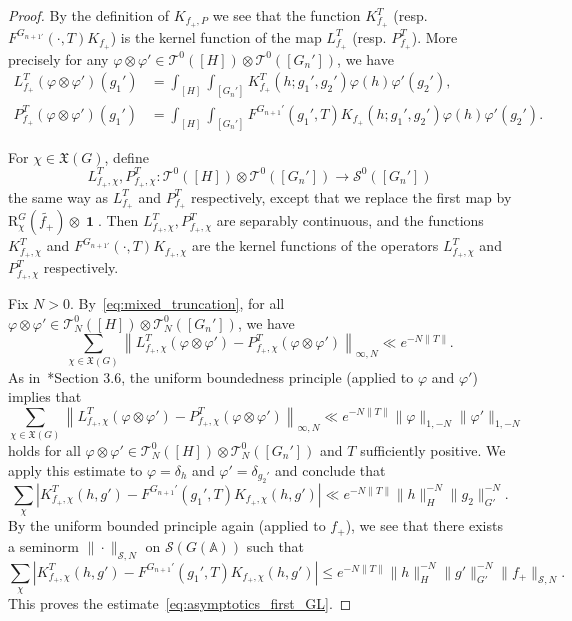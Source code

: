 \documentclass[letterpaper,11pt]{amsart}
\newcommand{\fX}{\mathfrak{X}}
\newcommand{\bA}{\mathbb{A}}
\newcommand{\cS}{\mathcal{S}}
\newcommand{\cT}{\mathcal{T}}
\newcommand{\<}{\negthickspace}
\providecommand{\aabs}[1]{\lVert#1\rVert}
\providecommand{\Abs}[1]{\left\lvert#1\right\rvert}
\DeclareMathOperator{\id}{\mathbf{1}}
\theoremstyle{definition}
\theoremstyle{plain}
\theoremstyle{remark}
\numberwithin{equation}{section}
\begin{document}
\begin{proof}
By the definition of $K_{f_+, P}$ we see that the function $K_{f_+}^T$ (resp.
$F^{G_{n+1'}}(\cdot,T) K_{f_+}$) is the kernel function of the map
$L_{f_+}^T$ (resp. $P_{f_+}^T$). More precisely for any $\varphi \otimes
\varphi' \in \cT^0([H]) \otimes \cT^0([G_n'])$, we have
    \[
    \begin{aligned}
    L_{f_+}^T(\varphi \otimes \varphi')(g_1')
    &= \int_{[H]} \int_{[G_n']} K_{f_+}^T(h; g_1',g_2')
    \varphi(h) \varphi'(g_2'), \\
    P_{f_+}^T(\varphi \otimes \varphi')(g_1')
    &= \int_{[H]} \int_{[G_n']} F^{G_{n+1}'}(g_1',T)
    K_{f_+}(h;g_1',g_2') \varphi(h) \varphi'(g_2').
    \end{aligned}
    \]

For $\chi \in \fX(G)$, define
    \[
    L_{f_+,\chi}^T, P_{f_+, \chi}^T: \cT^0([H]) \otimes
    \cT^0([G_n']) \to \cS^0([G_n'])
    \]
the same way as $L_{f_+}^T$ and $P_{f_+}^T$ respectively, except that we
replace the first map by $\mathrm{R}_{\chi}^G(\widetilde{f_+}) \otimes \id$.
Then $L_{f_+,\chi}^T, P_{f_+, \chi}^T$ are separably continuous, and the functions $K_{f_+,\chi}^T$ and $F^{G_{n+1'}}(\cdot,T)
K_{f_+,\chi}$ are the kernel functions of the operators $L_{f_+,\chi}^T$ and $P_{f_+,\chi}^T$ respectively.


Fix $N >0$. By~\eqref{eq:mixed_truncation}, for all $\varphi \otimes \varphi'
\in \cT_N^0([H]) \otimes \cT_N^0([G_n'])$, we have
    \[
    \sum_{\chi \in \fX(G)} \left\| L_{f_+,\chi}^T (\varphi \otimes \varphi')
    -  P_{f_+,\chi}^T (\varphi \otimes \varphi') \right\|_{\infty,N}
    \ll e^{-N\aabs{T}}.
    \]
As in~\cite{BPCZ}*{Section 3.6}, the uniform boundedness principle (applied to
$\varphi$ and $\varphi'$) implies that
    \[
    \sum_{\chi \in \fX(G)} \left\| L_{f_+,\chi}^T (\varphi \otimes \varphi') -
    P_{f_+,\chi}^T (\varphi \otimes \varphi') \right\|_{\infty,N}
    \ll e^{-N\|T\|} \| \varphi \|_{1,-N} \| \varphi' \|_{1,-N}
    \]
holds for all $\varphi \otimes \varphi' \in \cT^0_N([H]) \otimes
\cT^0_N([G_n'])$ and $T$ sufficiently positive. We apply this estimate to $\varphi
= \delta_h$ and $\varphi' = \delta_{g_2'}$ and conclude that
    \[
    \sum_{\chi} \Abs{ K_{f_+, \chi}^T(h, g') -
    F^{G_{n+1}'}(g_1', T) K_{f_+, \chi}(h, g') } \ll e^{-N\aabs{T}}
    \aabs{h}_{H}^{-N} \aabs{g_2}_{G'}^{-N}.
    \]
By the uniform bounded principle again (applied to $f_+$), we see that there
exists a seminorm $\|\cdot \|_{\cS, N}$ on $\cS(G(\bA))$ such that
  \[
     \sum_{\chi} \left| K_{f_+, \chi}^T(h, g') -
    F^{G_{n+1}'}(g_1', T) K_{f_+, \chi}(h, g') \right| \leq e^{-N\| T \|}
    \|h\|_{H}^{-N}
    \|g'\|_{G'}^{-N} \|f_+\|_{\cS, N}.
    \]
This proves the estimate~\eqref{eq:asymptotics_first_GL}.
\end{proof}
\end{document}
